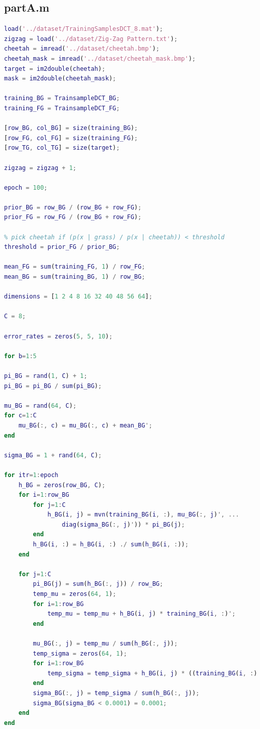 \documentclass{article}
\begin{document}
\subsection*{partA.m}

\begin{lstlisting}[language=Matlab]
load('../dataset/TrainingSamplesDCT_8.mat');
zigzag = load('../dataset/Zig-Zag Pattern.txt');
cheetah = imread('../dataset/cheetah.bmp');
cheetah_mask = imread('../dataset/cheetah_mask.bmp');
target = im2double(cheetah);
mask = im2double(cheetah_mask);

training_BG = TrainsampleDCT_BG;
training_FG = TrainsampleDCT_FG;

[row_BG, col_BG] = size(training_BG);
[row_FG, col_FG] = size(training_FG);
[row_TG, col_TG] = size(target);

zigzag = zigzag + 1;

epoch = 100;

prior_BG = row_BG / (row_BG + row_FG);
prior_FG = row_FG / (row_BG + row_FG);

% pick cheetah if (p(x | grass) / p(x | cheetah)) < threshold
threshold = prior_FG / prior_BG;

mean_FG = sum(training_FG, 1) / row_FG;
mean_BG = sum(training_BG, 1) / row_BG;

dimensions = [1 2 4 8 16 32 40 48 56 64];

C = 8;

error_rates = zeros(5, 5, 10);

for b=1:5

pi_BG = rand(1, C) + 1;
pi_BG = pi_BG / sum(pi_BG);

mu_BG = rand(64, C);
for c=1:C
    mu_BG(:, c) = mu_BG(:, c) + mean_BG';
end

sigma_BG = 1 + rand(64, C);

for itr=1:epoch
    h_BG = zeros(row_BG, C);
    for i=1:row_BG
        for j=1:C
            h_BG(i, j) = mvn(training_BG(i, :), mu_BG(:, j)', ...
                diag(sigma_BG(:, j)')) * pi_BG(j);
        end
        h_BG(i, :) = h_BG(i, :) ./ sum(h_BG(i, :));
    end

    for j=1:C
        pi_BG(j) = sum(h_BG(:, j)) / row_BG;
        temp_mu = zeros(64, 1);
        for i=1:row_BG
            temp_mu = temp_mu + h_BG(i, j) * training_BG(i, :)';
        end
        
        mu_BG(:, j) = temp_mu / sum(h_BG(:, j));
        temp_sigma = zeros(64, 1);
        for i=1:row_BG
            temp_sigma = temp_sigma + h_BG(i, j) * ((training_BG(i, :)' - mu_BG(:, j)).^2);
        end
        sigma_BG(:, j) = temp_sigma / sum(h_BG(:, j));
        sigma_BG(sigma_BG < 0.0001) = 0.0001;
    end
end


\end{lstlisting}
\end{document}
